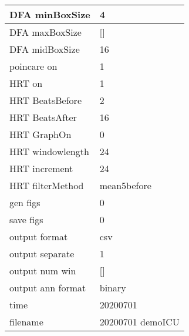 \begin{tabular}{|l|l|}
DFA minBoxSize&4\\\hline
DFA maxBoxSize&[]\\\hline
DFA midBoxSize&16\\\hline
poincare on&1\\\hline
HRT on&1\\\hline
HRT BeatsBefore&2\\\hline
HRT BeatsAfter&16\\\hline
HRT GraphOn&0\\\hline
HRT windowlength&24\\\hline
HRT increment&24\\\hline
HRT filterMethod&mean5before\\\hline
gen figs&0\\\hline
save figs&0\\\hline
output format&csv\\\hline
output separate&1\\\hline
output num win&[]\\\hline
output ann format&binary\\\hline
time&20200701\\\hline
filename&20200701 demoICU\\\hline
\end{tabular}
